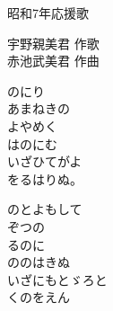 \documentclass[10pt,b5j]{tarticle} %
\begin{document}
\begin{minipage}[c]{0.7\hsize} %
    \begin{center}
        {\LARGE
            昭和7年応援歌 %
        }
        {\small 
        }
    \end{center}
\end{minipage}
\begin{minipage}[c]{0.3\hsize} %
    \begin{flushright} %
        宇野親美君 作歌\\赤池武美君 作曲 %
    \end{flushright}
\end{minipage}

\vspace{1.5em} %
\newcommand{\linespace}{0.5em} %
\newcommand{\blocksize}{0.5\hsize} %
\begin{enumerate} %
    \begin{minipage}[c]{\blocksize}
    
        \vspace{\linespace}
        \item
        のにり\\
        あまねきの\\
        よやめく\\
        はのにむ\\
        いざひてがよ\\
        をるはりぬ。
        
        \vspace{\linespace}
        \item
        のとよもして\\
        ぞつの\\
        るのに\\
        ののはきぬ\\
        いざにもとゞろと\\
        くのをえん
    
    \end{minipage}
\end{enumerate} %
\end{document}
